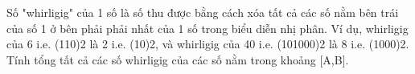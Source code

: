 Số "whirligig" của 1 số là số thu được bằng cách xóa tất cả các số nằm bên trái của số 1 ở bên phải phải nhất của 1 số trong biểu diễn nhị phân. Ví dụ, whirligig của 6 i.e. (110)2 là 2 i.e. (10)2, và whirligig của 40 i.e. (101000)2 là 8 i.e. (1000)2. Tính tổng tất cả các số whirligig của các số nằm trong khoảng [A,B].